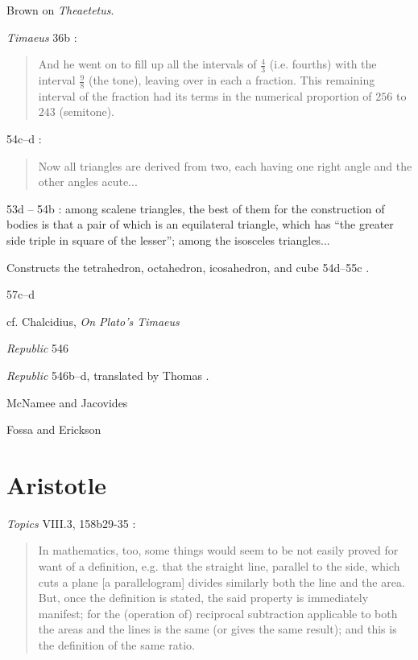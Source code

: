 \documentclass{amsart}
\theoremstyle{definition}
\begin{document}
Brown \cite{brown} on {\em Theaetetus}.


{\em Timaeus} 36b \cite[pp.~71--72]{timaeus}:

\begin{quote}
And he went on to fill up all the intervals of $\frac{4}{3}$ (i.e. fourths) with the interval $\frac{9}{8}$ (the tone), leaving over in each a fraction.
This remaining interval of the fraction had its terms in the numerical proportion of $256$ to $243$ (semitone).
\end{quote}

54c--d \cite[p.~212]{timaeus}: 

\begin{quote}
Now all triangles are derived from two, each having one right angle and the other angles acute...
\end{quote}

53d -- 54b \cite[pp.~213--214]{timaeus}: among scalene triangles, the best of them for the construction of bodies is that a pair of which is an equilateral triangle, which has ``the greater
side triple in square of the lesser''; among the isosceles triangles...

Constructs the tetrahedron, octahedron, icosahedron, and cube 54d--55c \cite[pp.~216--218]{timaeus}. 

57c--d \cite[p.~235]{timaeus}

cf. Chalcidius, {\em On Plato's Timaeus}

{\em Republic} 546

{\em Republic} 546b--d, translated by Thomas \cite[pp.~398--401]{thomasI}.

McNamee and Jacovides \cite{papyrus}

Fossa and Erickson \cite{births}






\section{Aristotle}
{\em Topics} VIII.3, 158b29-35 \cite[p.~80]{aristotle}:

\begin{quote}
In mathematics, too, some things would seem to be not easily
proved for want of a definition, e.g. that the straight line, parallel
to the side, which cuts a plane [a parallelogram] divides similarly
both the line and the area. But, once the definition is stated, the
said property is immediately manifest; for the (operation of)
reciprocal subtraction applicable to both the areas and the lines is
the same (or gives the same result); and this is the definition of the
same ratio.
\end{quote}
\end{document}
